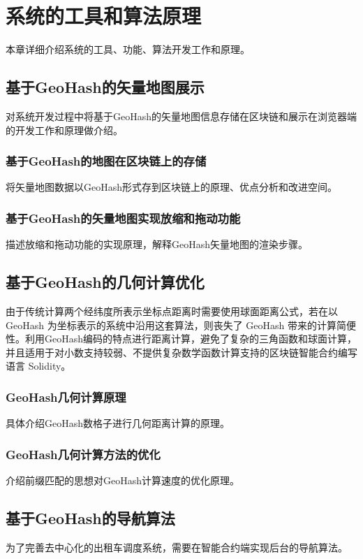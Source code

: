 \chapter{系统的工具和算法原理}
本章详细介绍系统的工具、功能、算法开发工作和原理。

\section{基于GeoHash的矢量地图展示}
对系统开发过程中将基于GeoHash的矢量地图信息存储在区块链和展示在浏览器端的开发工作和原理做介绍。
\subsection{基于GeoHash的地图在区块链上的存储}
将矢量地图数据以GeoHash形式存到区块链上的原理、优点分析和改进空间。
\subsection{基于GeoHash的矢量地图实现放缩和拖动功能}
描述放缩和拖动功能的实现原理，解释GeoHash矢量地图的渲染步骤。

\section{基于GeoHash的几何计算优化}


由于传统计算两个经纬度所表示坐标点距离时需要使用球面距离公式，若在以 GeoHash 为坐标表示的系统中沿用这套算法，则丧失了 GeoHash 带来的计算简便性。利用GeoHash编码的特点进行距离计算，避免了复杂的三角函数和球面计算，并且适用于对小数支持较弱、不提供复杂数学函数计算支持的区块链智能合约编写语言 Solidity。
\subsection{GeoHash几何计算原理}
具体介绍GeoHash数格子进行几何距离计算的原理。
\subsection{GeoHash几何计算方法的优化}
介绍前缀匹配的思想对GeoHash计算速度的优化原理。

\section{基于GeoHash的导航算法}
为了完善去中心化的出租车调度系统，需要在智能合约端实现后台的导航算法。
